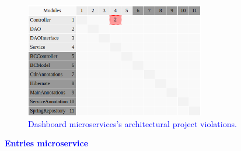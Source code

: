 \documentclass[12pt]{article}
\begin{document}
\begin{figure}[ht]
\centering
\includegraphics[width=0.7\textwidth]{figuras/violacoesDashboard.png}
\caption{\textcolor{blue}{Dashboard microservices's architectural project violations.}}
\label{fig:microservices}
\end{figure}

\newpage
\noindent\textbf{\large{\textcolor{blue}{Entries microservice}}}
\label{sec:ApendiceEntries}
\end{document}
